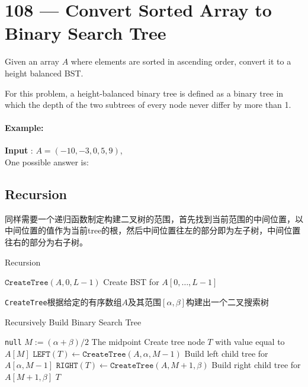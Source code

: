 \section{108 --- Convert Sorted Array to Binary Search Tree}
Given an array $A$ where elements are sorted in ascending order, convert it to a height balanced BST.
\par
For this problem, a height-balanced binary tree is defined as a binary tree in which the depth of the two subtrees of every node never differ by more than 1.
\paragraph{Example:}
\begin{flushleft}
\textbf{Input} : $A = (-10,-3,0,5,9)$,
\\
One possible answer is:
\begin{figure}[H]
\end{figure}
 \end{flushleft}
 \subsection{Recursion}
 同样需要一个递归函数制定构建二叉树的范围，首先找到当前范围的中间位置，以中间位置的值作为当前tree的根，然后中间位置往左的部分即为左子树，中间位置往右的部分为右子树。
\setcounter{algorithm}{0}
\begin{algorithm}[H]
\caption{Recursion}
\begin{algorithmic}[1]
\State \Return $\texttt{CreateTree}(A, 0, L-1)$ \Comment Create BST for $A[0,\ldots, L-1]$
\EndProcedure
\end{algorithmic}
\end{algorithm}
\texttt{CreateTree}根据给定的有序数组$A$及其范围$[\alpha, \beta]$构建出一个二叉搜索树
\begin{algorithm}[H]
\caption{Recursively Build Binary Search Tree}
\begin{algorithmic}[1]
\If{$\alpha > \beta$}
\State \Return \texttt{null}
\EndIf
\State $M:=(\alpha+\beta)/2$ \Comment The midpoint
\State Create tree node $T$ with value equal to $A[M]$
\State $\texttt{LEFT}(T)\gets \texttt{CreateTree}(A, \alpha, M-1)$ \Comment Build left child tree for $A[\alpha, M-1]$
\State $\texttt{RIGHT}(T)\gets \texttt{CreateTree}(A, M+1, \beta)$ \Comment Build right child tree for $A[M+1, \beta]$
\State \Return $T$
\EndFunction 
\end{algorithmic}
\end{algorithm}